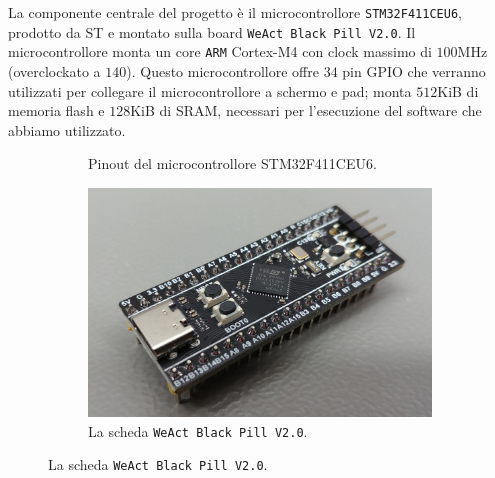 \documentclass[hidelinks,12pt]{article}
\begin{document}
La componente centrale del progetto è il microcontrollore
\texttt{STM32F411CEU6}, prodotto da ST e montato sulla board \texttt{WeAct Black
	Pill V2.0}. Il microcontrollore monta un core \texttt{ARM} Cortex-M4 con clock
massimo di $100$MHz (overclockato a $140$). Questo microcontrollore offre $34$
pin GPIO che verranno utilizzati per collegare il microcontrollore a schermo e
pad; monta $512$KiB di memoria flash e $128$KiB di SRAM, necessari per
l'esecuzione del software che abbiamo utilizzato.
\begin{figure}
	\begin{subfigure}[b]{0.45\textwidth}
		\begin{center}
			\begin{tikzpicture}[x=0.015cm, y=0.015cm, scale=0.5, transform shape]
				
			\end{tikzpicture}
		\end{center}
		\caption{Pinout del microcontrollore STM32F411CEU6.}
		\label{fig:pinout_stm32}
	\end{subfigure}
	\hfill
	\begin{subfigure}[b]{0.45\textwidth}
		\begin{center}
			\includegraphics[scale=0.5]{figures/stm32.jpg}
		\end{center}
		\caption{La scheda \texttt{WeAct Black Pill V2.0}.}
		\label{fig:weact_blackpill}
	\end{subfigure}
\end{figure}
\end{document}
